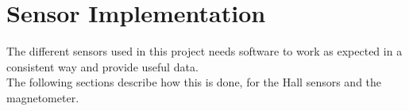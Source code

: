 \chapter{Sensor Implementation}\label{chap:sensorsImplementation}
The different sensors used in this project needs software to work as expected in a consistent way and provide useful data.\\
The following sections describe how this is done, for the Hall sensors and the magnetometer.